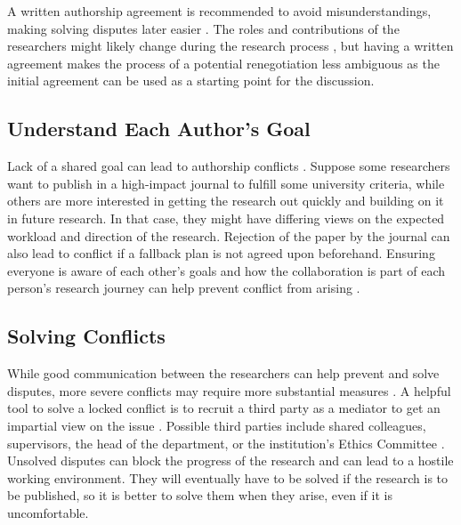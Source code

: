 A written authorship agreement is recommended to avoid misunderstandings, making solving disputes later easier \cite{albertHowHandleAuthorship2003}.
The roles and contributions of the researchers might likely change during the research process \parencite[p.81]{ewartAuthorshipCoAuthoringCollaborating2023}, but having a written agreement makes the process of a potential renegotiation less ambiguous as the initial agreement can be used as a starting point for the discussion.

\subsection{Understand Each Author's Goal}
Lack of a shared goal can lead to authorship conflicts \cite{pilebergCoauthorshipExpertsHave2022}.
Suppose some researchers want to publish in a high-impact journal to fulfill some university criteria, while others are more interested in getting the research out quickly and building on it in future research.
In that case, they might have differing views on the expected workload and direction of the research.
Rejection of the paper by the journal can also lead to conflict if a fallback plan is not agreed upon beforehand.
Ensuring everyone is aware of each other's goals and how the collaboration is part of each person's research journey can help prevent conflict from arising \cite{pilebergCoauthorshipExpertsHave2022}.

\subsection{Solving Conflicts}
While good communication between the researchers can help prevent and solve disputes, more severe conflicts may require more substantial measures \parencite[p.82]{ewartAuthorshipCoAuthoringCollaborating2023}.
A helpful tool to solve a locked conflict is to recruit a third party as a mediator to get an impartial view on the issue \cite{pilebergCoauthorshipExpertsHave2022}.
Possible third parties include shared colleagues, supervisors, the head of the department, or the institution's Ethics Committee \cite{ntnuEthicsPortalNTNU}.
Unsolved disputes can block the progress of the research and can lead to a hostile working environment.
They will eventually have to be solved if the research is to be published, so it is better to solve them when they arise, even if it is uncomfortable.

